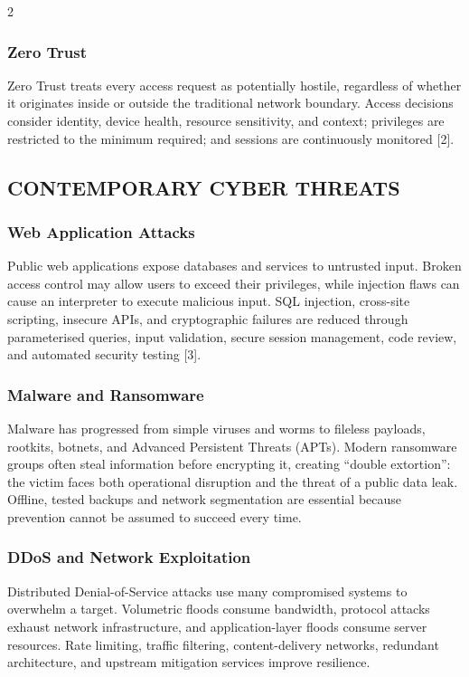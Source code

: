 \begin{multicols}{2}
  \subsubsection*{Zero Trust}
  Zero Trust treats every access request as potentially hostile, regardless of whether it originates inside or outside the traditional network boundary. Access decisions consider identity, device health, resource sensitivity, and context; privileges are restricted to the minimum required; and sessions are continuously monitored [2].

  \subsection*{\centering\uppercase{Contemporary Cyber Threats}}
  \subsubsection*{Web Application Attacks}
  Public web applications expose databases and services to untrusted input. Broken access control may allow users to exceed their privileges, while injection flaws can cause an interpreter to execute malicious input. SQL injection, cross-site scripting, insecure APIs, and cryptographic failures are reduced through parameterised queries, input validation, secure session management, code review, and automated security testing [3].

  \subsubsection*{Malware and Ransomware}
  Malware has progressed from simple viruses and worms to fileless payloads, rootkits, botnets, and Advanced Persistent Threats (APTs). Modern ransomware groups often steal information before encrypting it, creating “double extortion”: the victim faces both operational disruption and the threat of a public data leak. Offline, tested backups and network segmentation are essential because prevention cannot be assumed to succeed every time.

  \subsubsection*{DDoS and Network Exploitation}
  Distributed Denial-of-Service attacks use many compromised systems to overwhelm a target. Volumetric floods consume bandwidth, protocol attacks exhaust network infrastructure, and application-layer floods consume server resources. Rate limiting, traffic filtering, content-delivery networks, redundant architecture, and upstream mitigation services improve resilience.


\end{multicols}
